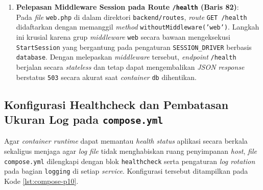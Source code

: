 \documentclass[a4paper,oneside,11pt]{book}
\begin{document}
\begin{enumerate}[leftmargin=*]
  \item \textbf{Pelepasan Middleware Session pada Route \texttt{/health} (Baris 82)}:\\
        Pada \textit{file} \texttt{web.php} di dalam direktori \texttt{backend/routes}, \textit{route} \texttt{GET /health} didaftarkan dengan memanggil \textit{method} \texttt{withoutMiddleware('web')}. Langkah ini krusial karena grup \textit{middleware} \texttt{web} secara bawaan mengeksekusi \texttt{StartSession} yang bergantung pada pengaturan \texttt{SESSION\_DRIVER} berbasis \texttt{database}. Dengan melepaskan \textit{middleware} tersebut, \textit{endpoint} \texttt{/health} berjalan secara \textit{stateless} dan tetap dapat mengembalikan \textit{JSON response} berstatus \texttt{503} secara akurat saat \textit{container} \texttt{db} dihentikan.
\end{enumerate}

\subsection{Konfigurasi Healthcheck dan Pembatasan Ukuran Log pada \texttt{compose.yml}}

\par Agar \textit{container runtime} dapat memantau \textit{health status} aplikasi secara berkala sekaligus menjaga agar \textit{log file} tidak menghabiskan ruang penyimpanan \textit{host}, \textit{file} \texttt{compose.yml} dilengkapi dengan blok \texttt{healthcheck} serta pengaturan \textit{log rotation} pada bagian \texttt{logging} di setiap \textit{service}. Konfigurasi tersebut ditampilkan pada Kode \ref{lst:compose-p10}.
\end{document}
